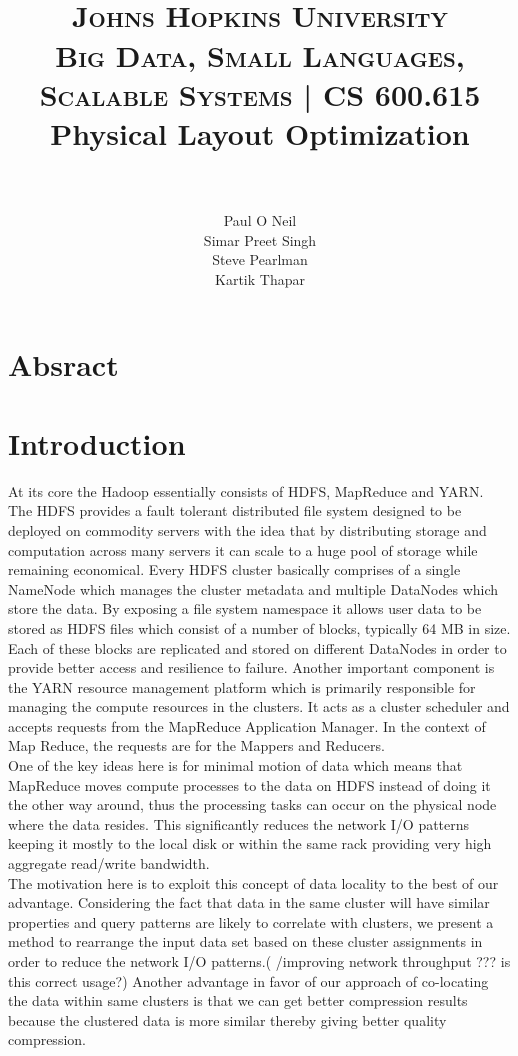 \documentclass[paper=letter, fontsize=11pt]{scrartcl}
\title{
		\vspace{-1in} 	
		\usefont{OT1}{bch}{b}{n}
		\horrule{1pt} \\[0.4cm]
	    \normalfont \textsc{Johns Hopkins University \\
		Big Data, Small Languages, \\ Scalable Systems | CS 600.615} \\ [20pt]
		\huge Physical Layout Optimization\\
		\horrule{1pt} \\[0.5cm]
}
\author{
		\normalfont
        Paul O Neil \\
        Simar Preet Singh\\
        Steve Pearlman\\
        Kartik Thapar\\[-3pt]		\normalsize
}
\date{}
\numberwithin{equation}{section}		%
\numberwithin{figure}{section}			%
\numberwithin{table}{section}				%
\begin{document}
\maketitle
\section{Absract}



\section{Introduction}


At its core the Hadoop essentially consists of HDFS, MapReduce and YARN. The HDFS provides a fault tolerant distributed file system designed to be deployed on commodity servers with the idea that by distributing storage and computation across many servers it can scale to a huge pool of storage while remaining economical. Every HDFS cluster basically comprises of a single NameNode which manages the cluster metadata and multiple DataNodes which store the data. By exposing a file system namespace it allows user data to be stored as HDFS files which consist of a number of blocks, typically 64 MB in size. Each of these blocks are replicated and stored on different DataNodes in order to provide better access and resilience to failure. Another important component is the YARN resource management platform which is primarily responsible for managing the compute resources in the clusters. It acts as a cluster scheduler and accepts requests from the MapReduce Application Manager. In the context of Map Reduce, the requests are for the Mappers and Reducers. \\

One of the key ideas here is for minimal motion of data which means that MapReduce moves compute processes to the data on HDFS instead of doing it the other way around, thus the processing tasks can occur on the physical node where the data resides. This significantly reduces the network I/O patterns keeping it mostly to the local disk or within the same rack providing very high aggregate read/write bandwidth.\\

The motivation here is to exploit this concept of data locality to the best of our advantage.  Considering the fact that data in the same cluster will have similar properties and query patterns are likely to correlate with clusters, we present a method to rearrange the input data set based on these cluster assignments in order to reduce the network I/O patterns.( /improving network throughput ??? is this correct usage?)
Another advantage in favor of our approach of co-locating the data within same clusters is that we can get better compression results because the clustered data is more similar thereby giving better quality compression.
\end{document}
